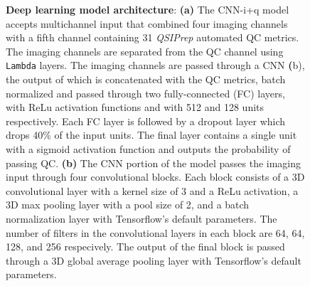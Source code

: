 \documentclass[fleqn,10pt]{wlscirep}
\begin{document}
\begin{figure}[tbp]
\begin{subfigure}[t]{0.4\textwidth}
    \end{subfigure}
    \caption{%
        {\bf Deep learning model architecture}:
        \textbf{(a)} The CNN-i+q model accepts multichannel input that combined
        four imaging channels with a fifth channel containing 31 \emph{QSIPrep}
        automated QC metrics. The imaging channels are separated from the QC
        channel using \texttt{Lambda} layers. The imaging channels are passed
        through a CNN \textbf(b), the output of which is concatenated with the
        QC metrics, batch normalized and passed through two fully-connected (FC)
        layers, with ReLu activation functions and with 512 and 128 units
        respectively. Each FC layer is followed by a dropout layer which drops
        40\% of the input units. The final layer contains a single unit with a
        sigmoid activation function and outputs the probability of passing QC.
        \textbf{(b)} The CNN portion of the model passes the imaging input
        through four convolutional blocks. Each block consists of a 3D
        convolutional layer with a kernel size of 3 and a ReLu activation, a 3D
        max pooling layer with a pool size of 2, and a batch normalization layer
        with Tensorflow's default parameters. The number of filters in the
        convolutional layers in each block are 64, 64, 128, and 256 respecively.
        The output of the final block is passed through a 3D global average
        pooling layer with Tensorflow's default parameters.
    }
    \label{fig:dl-architecture}
\end{figure}
\end{document}
